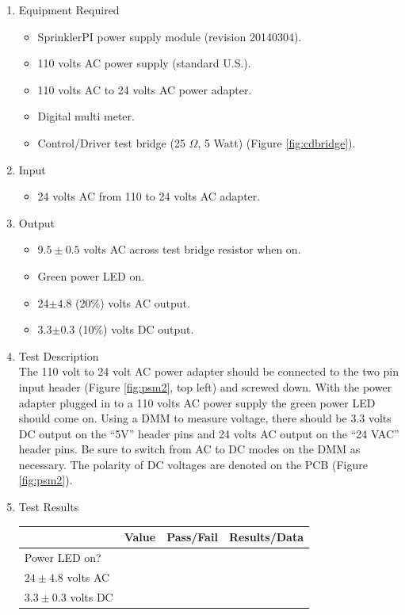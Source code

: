 \documentclass{article}
\begin{document}
\begin{enumerate}
\item Equipment Required
	\begin{itemize}
	\item SprinklerPI power supply module (revision 20140304).
	\item 110 volts AC power supply (standard U.S.).
	\item 110 volts AC to 24 volts AC power adapter.
	\item Digital multi meter.
	\item Control/Driver test bridge (25 $\Omega$, 5 Watt)
			(Figure \ref{fig:cdbridge}).
	\end{itemize}
\item Input
	\begin{itemize}
	\item 24 volts AC from 110 to 24 volts AC adapter.
	\end{itemize}
\item Output
	\begin{itemize}
	\item $9.5\pm0.5$ volts AC across test bridge resistor when on.
	\item Green power LED on.
	\item 24$\pm4.8$ (20\%) volts AC output.
	\item 3.3$\pm0.3$ (10\%) volts DC output.
	\end{itemize}
\pagebreak
\item Test Description \\

The 110 volt to 24 volt AC power adapter should be connected to the
two pin input header (Figure \ref{fig:psm2}, top left) and screwed down.
With the power adapter plugged in to a 110 volts AC power supply the
green power LED should come on.
Using a DMM to measure voltage, there should be 3.3 volts DC output on
the ``5V'' header pins and 24 volts AC output on the ``24 VAC'' header pins.
Be sure to switch from AC to DC modes on the DMM as necessary.
The polarity of DC voltages are denoted on the PCB (Figure \ref{fig:psm2}).

\item Test Results \\
	\vspace{0.2in}
	\begin{tabular}{|l|l|l|l|}
		\hline
		& Value & Pass/Fail & Results/Data\hspace{2in} \\
		\hline
		Power LED on? &&& \\
		\hline
		$24\pm4.8$ volts AC &&& \\
		\hline
		$3.3\pm0.3$ volts DC &&& \\
		\hline
	\end{tabular}


\end{enumerate}
\end{document}
